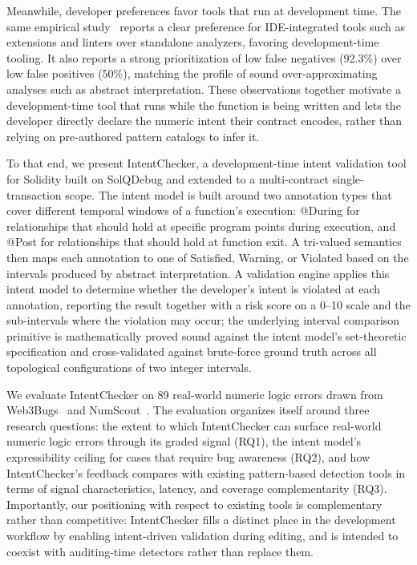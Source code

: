 \documentclass[pdflatex,sn-basic]{sn-jnl}%
\theoremstyle{thmstyleone}%
\theoremstyle{thmstyletwo}%
\theoremstyle{thmstylethree}%
\begin{document}
Meanwhile, developer preferences favor tools that run at development time. The same empirical study~\citep{defisecurity} reports a clear preference for IDE-integrated tools such as extensions and linters over standalone analyzers, favoring development-time tooling. It also reports a strong prioritization of low false negatives (92.3\%) over low false positives (50\%), matching the profile of sound over-approximating analyses such as abstract interpretation.
These observations together motivate a development-time tool that runs while the function is being written and lets the developer directly declare the numeric intent their contract encodes, rather than relying on pre-authored pattern catalogs to infer it.

To that end, we present IntentChecker, a development-time intent validation tool for Solidity built on SolQDebug and extended to a multi-contract single-transaction scope.
The intent model is built around two annotation types that cover different temporal windows of a function's execution: @During for relationships that should hold at specific program points during execution, and @Post for relationships that should hold at function exit. A tri-valued semantics then maps each annotation to one of Satisfied, Warning, or Violated based on the intervals produced by abstract interpretation.
A validation engine applies this intent model to determine whether the developer's intent is violated at each annotation, reporting the result together with a risk score on a 0--10 scale and the sub-intervals where the violation may occur; the underlying interval comparison primitive is mathematically proved sound against the intent model's set-theoretic specification and cross-validated against brute-force ground truth across all topological configurations of two integer intervals.

We evaluate IntentChecker on 89 real-world numeric logic errors drawn from Web3Bugs~\citep{exploitablebugs} and NumScout~\citep{numscout}.
The evaluation organizes itself around three research questions: the extent to which IntentChecker can surface real-world numeric logic errors through its graded signal (RQ1), the intent model's expressibility ceiling for cases that require bug awareness (RQ2), and how IntentChecker's feedback compares with existing pattern-based detection tools in terms of signal characteristics, latency, and coverage complementarity (RQ3).
Importantly, our positioning with respect to existing tools is complementary rather than competitive: IntentChecker fills a distinct place in the development workflow by enabling intent-driven validation during editing, and is intended to coexist with auditing-time detectors rather than replace them.
\end{document}
